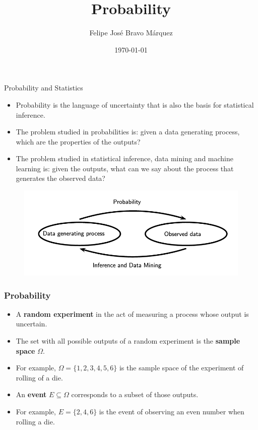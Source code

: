 \documentclass[handout]{beamer}
\title{Probability}
\author[Felipe Bravo Márquez]{\footnotesize
 \textcolor[rgb]{0.00,0.00,1.00}{Felipe José Bravo Márquez}}
\date{ \today }
\begin{document}
\begin{frame}
\titlepage


\end{frame}



\begin{frame}{Probability and Statistics}

\scriptsize{
\begin{itemize}
 \item Probability is the language of uncertainty that is also the basis for statistical inference.
 \item The problem studied in probabilities is: given a data generating process, which are the properties of the outputs?
 \item The problem studied in statistical inference, data mining and machine learning is: given the outputs, what can we say about the process that generates the observed data? 
\end{itemize}

}
\begin{figure}[h!]
	\centering
	\includegraphics[scale=0.3]{pics/probandstats.png}
\end{figure}


\end{frame}

\begin{frame}\frametitle{Probability}
\scriptsize{

\begin{itemize}
 \item A \textbf{random experiment} in the act of measuring a process whose output is uncertain.
 \item The set with all possible outputs of a random experiment is the \textbf{sample space} $\Omega$.
 \item For example, $\Omega = \{ 1,2,3,4,5,6 \}$ is the sample space of the experiment of rolling of a die.
 \item An \textbf{event} $E \subseteq \Omega$ corresponds to a subset of those outputs.
 \item For example, $E = \{ 2,4,6 \}$ is the event of observing an even number when rolling a die.
\end{itemize}

}

\end{frame}
\end{document}

